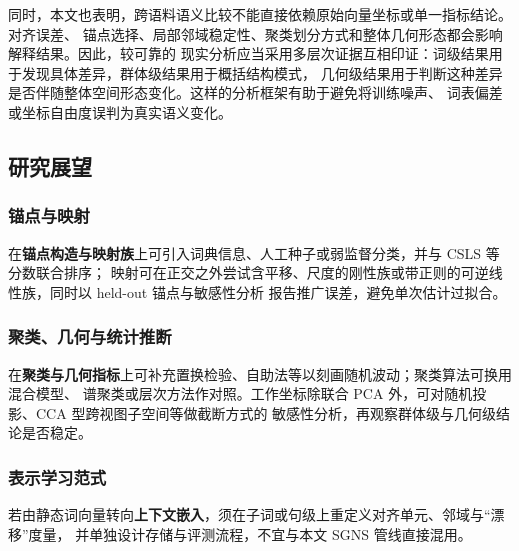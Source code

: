 \documentclass[withoutpreface]{cumcmthesis}
\begin{document}
同时，本文也表明，跨语料语义比较不能直接依赖原始向量坐标或单一指标结论。对齐误差、
锚点选择、局部邻域稳定性、聚类划分方式和整体几何形态都会影响解释结果。因此，较可靠的
现实分析应当采用多层次证据互相印证：词级结果用于发现具体差异，群体级结果用于概括结构模式，
几何级结果用于判断这种差异是否伴随整体空间形态变化。这样的分析框架有助于避免将训练噪声、
词表偏差或坐标自由度误判为真实语义变化。

\subsection{研究展望}

\subsubsection{锚点与映射}
在\textbf{锚点构造与映射族}上可引入词典信息、人工种子或弱监督分类，并与 CSLS 等分数联合排序；
映射可在正交之外尝试含平移、尺度的刚性族或带正则的可逆线性族，同时以 held-out 锚点与敏感性分析
报告推广误差，避免单次估计过拟合。

\subsubsection{聚类、几何与统计推断}
在\textbf{聚类与几何指标}上可补充置换检验、自助法等以刻画随机波动；聚类算法可换用混合模型、
谱聚类或层次方法作对照。工作坐标除联合 PCA 外，可对随机投影、CCA 型跨视图子空间等做截断方式的
敏感性分析，再观察群体级与几何级结论是否稳定。

\subsubsection{表示学习范式}
若由静态词向量转向\textbf{上下文嵌入}，须在子词或句级上重定义对齐单元、邻域与“漂移”度量，
并单独设计存储与评测流程，不宜与本文 SGNS 管线直接混用。
\end{document}
